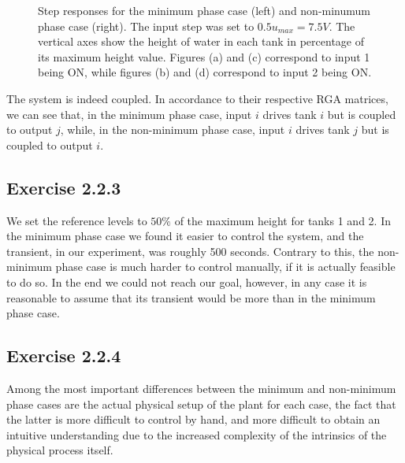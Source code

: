 \begin{figure}[ht]
\begin{multicols}{2}
\subfigure[]{
  \scalebox{0.6}{}
  \label{fig:}}
\quad
\subfigure[]{
  \scalebox{0.6}{}
  \label{fig:}}

\subfigure[]{
  \scalebox{0.6}{}
  \label{fig:}}
\quad
\subfigure[]{
  \scalebox{0.6}{}
  \label{fig:}}

\end{multicols}
\caption{Step responses for the minimum phase case (left) and non-minumum phase
  case (right). The input step was set to $0.5 u_{max} = 7.5V$. The vertical
  axes show the height of water in each tank in percentage of its maximum height
  value. Figures (a) and (c) correspond to input 1 being ON, while figures
  (b) and (d) correspond to input 2 being ON.}
\label{fig:222}
\end{figure}

The system is indeed coupled. In accordance to their respective RGA matrices,
we can see that, in the minimum phase case, input $i$ drives tank $i$ but is
coupled to output $j$, while, in the non-minimum phase case, input $i$ drives
tank $j$ but is coupled to output $i$.


\subsection*{Exercise 2.2.3}

We set the reference levels to $50\%$ of the maximum height for tanks 1 and 2.
In the minimum phase case we found it easier to control the system, and the
transient, in our experiment, was roughly 500 seconds. Contrary to this, the
non-minimum phase case is much harder to control manually, if it is actually
feasible to do so. In the end we could not reach our goal, however, in any case
it is reasonable to assume that its transient would be more than in the
minimum phase case.


\subsection*{Exercise 2.2.4}

Among the most important differences between the minimum and non-minimum phase
cases are the actual physical setup of the plant for each case, the fact that
the latter is more difficult to control by hand, and more difficult to obtain
an intuitive understanding due to the increased complexity of the intrinsics
of the physical process itself.
